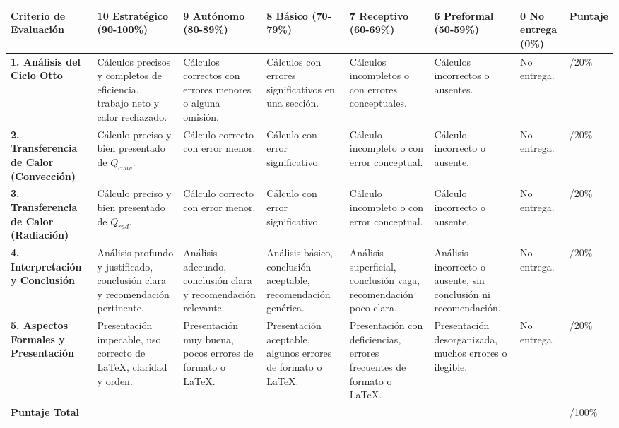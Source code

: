 \documentclass{article}
\begin{document}
\begin{tabularx}{\textwidth}{|X|X|X|X|X|X|X|X|}
\hline
\textbf{Criterio de Evaluación} & \textbf{10 Estratégico (90-100\%)} & \textbf{9 Autónomo (80-89\%)} & \textbf{8 Básico (70-79\%)} & \textbf{7 Receptivo (60-69\%)} & \textbf{6 Preformal (50-59\%)} & \textbf{0 No entrega (0\%)} & \textbf{Puntaje} \\
\hline
\textbf{1. Análisis del Ciclo Otto} & Cálculos precisos y completos de eficiencia, trabajo neto y calor rechazado. & Cálculos correctos con errores menores o alguna omisión. & Cálculos con errores significativos en una sección. & Cálculos incompletos o con errores conceptuales. & Cálculos incorrectos o ausentes. & No entrega. & /20\% \\
\hline
\textbf{2. Transferencia de Calor (Convección)} & Cálculo preciso y bien presentado de $Q_{conv}$. & Cálculo correcto con error menor. & Cálculo con error significativo. & Cálculo incompleto o con error conceptual. & Cálculo incorrecto o ausente. & No entrega. & /20\% \\
\hline
\textbf{3. Transferencia de Calor (Radiación)} & Cálculo preciso y bien presentado de $Q_{rad}$. & Cálculo correcto con error menor. & Cálculo con error significativo. & Cálculo incompleto o con error conceptual. & Cálculo incorrecto o ausente. & No entrega. & /20\% \\
\hline
\textbf{4. Interpretación y Conclusión} & Análisis profundo y justificado, conclusión clara y recomendación pertinente. & Análisis adecuado, conclusión clara y recomendación relevante. & Análisis básico, conclusión aceptable, recomendación genérica. & Análisis superficial, conclusión vaga, recomendación poco clara. & Análisis incorrecto o ausente, sin conclusión ni recomendación. & No entrega. & /20\% \\
\hline
\textbf{5. Aspectos Formales y Presentación} & Presentación impecable, uso correcto de LaTeX, claridad y orden. & Presentación muy buena, pocos errores de formato o LaTeX. & Presentación aceptable, algunos errores de formato o LaTeX. & Presentación con deficiencias, errores frecuentes de formato o LaTeX. & Presentación desorganizada, muchos errores o ilegible. & No entrega. & /20\% \\
\hline
\textbf{Puntaje Total} & & & & & & & /100\% \\
\hline
\end{tabularx}
\end{document}
